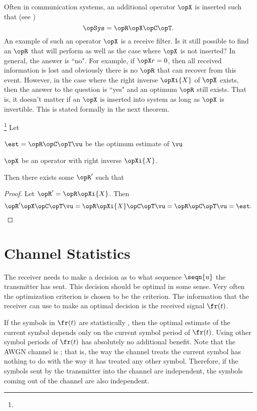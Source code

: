 {Often in communication systems, an additional  operator $\opX$ is
inserted such that (see )
   \[ \opSys = \opR\opX\opC\opT.\]
An example of such an operator $\opX$ is a receive filter.
Is it still possible to find an $\opR$ that will perform as well as
the case where $\opX$ is not inserted?
In general, the answer is ``no".
For example, if $\opX r=0$, then all received information is lost
and obviously there is no $\opR$ that can recover from this event.
However, in the case where the right inverse $\opXi{X}$ of $\opX$ exists,
then the answer to the question is ``yes" and an optimum  $\opR$
still exists.
That is, it doesn't matter if an $\opX$ is inserted into system
as long as $\opX$ is invertible.
This is stated formally in the next theorem.
\begin{theorem}
\footnote{
  }
\label{thm:reversibility}
Let
\begin{liste}
   \item $\est = \opR\opC\opT\vu$ be the optimum estimate of $\vu$
   \item $\opX$ be an operator with right inverse $\opXi{X}$.
\end{liste}
Then there exists some $\opR'$ such that
\end{theorem}
\begin{proof}
  Let $\opR'=\opR\opXi{X}$.
  Then
  \[ \opR'\opX\opC\opT\vu = \opR\opXi{X}\opC\opT\vu = \opR\opC\opT\vu = \est. \]
\end{proof}





\section{Channel Statistics}
The receiver needs to make a decision as to what
sequence $\seqn{u}$ the transmitter has sent.
This decision should be optimal in some sense.
Very often the optimization criterion is chosen to be
the  criterion.
The information that the receiver can use to make an optimal
decision is the received signal $\fr(t)$.

If the symbols in $\fr(t)$ are statistically ,
then the optimal estimate of the current symbol depends only on the
current symbol period of $\fr(t)$.
Using other symbol periods of $\fr(t)$ has absolutely no
additional benefit.
Note that the AWGN channel is ;
that is, the way the channel treats the current symbol has
nothing to do with the way it has treated any other symbol.
Therefore, if the symbols sent by the transmitter into the channel
are independent, the symbols coming out of the channel are also
independent.

}
